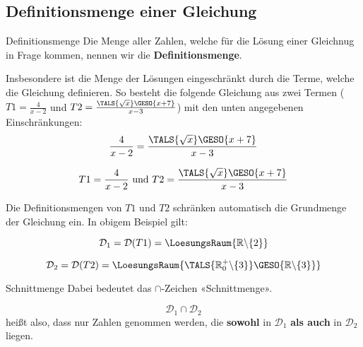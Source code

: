 \newpage

  
\subsection{Definitionsmenge einer
    Gleichung}

\begin{definition}{Definitionsmenge}{}  Die Menge aller Zahlen, welche für die Lösung einer Gleichnug in Frage kommen,
  nennen wir die \textbf{Definitionsmenge}.
\end{definition}

  Insbesondere ist die Menge der Lösungen eingeschränkt durch
  die Terme, welche die Gleichung definieren. So besteht die folgende
  Gleichung aus zwei Termen ($T1=\frac{4}{x-2}$ und $T2=\frac{\TALS{\sqrt{x}}\GESO{x+7}}{x-3}$) mit den unten angegebenen
  Einschränkungen:
  $$\frac{4}{x-2}=\frac{\TALS{\sqrt{x}}\GESO{x+7}}{x-3}$$

$$T1=\frac{4}{x-2} \text{ und } T2=\frac{\TALS{\sqrt{x}}\GESO{x+7}}{x-3}$$
  
  Die Definitionsmengen von $T1$ und $T2$ schränken automatisch die
  Grundmenge der Gleichung ein. In obigem Beispiel gilt:
  
  $$\mathcal{D}_1=\mathcal{D}(T1)=\LoesungsRaum{\mathbb{R}\backslash\{2\}}$$

  $$\mathcal{D}_2=\mathcal{D}(T2)=\LoesungsRaum{\TALS{\mathbb{R}^+_0\backslash\{3\}}\GESO{\mathbb{R}\backslash{}\{3\}}}$$

  

  \begin{bemerkung}{Schnittmenge}{}
    Dabei bedeutet das $\cap$-Zeichen «Schnittmenge».

    $$\mathcal{D}_1\cap\mathcal{D}_2$$
    heißt also, dass nur Zahlen genommen werden, die \textbf{sowohl}
    in $\mathcal{D}_1$ \textbf{als auch} in $\mathcal{D}_2$ liegen.
    \end{bemerkung}

  \newpage
    
